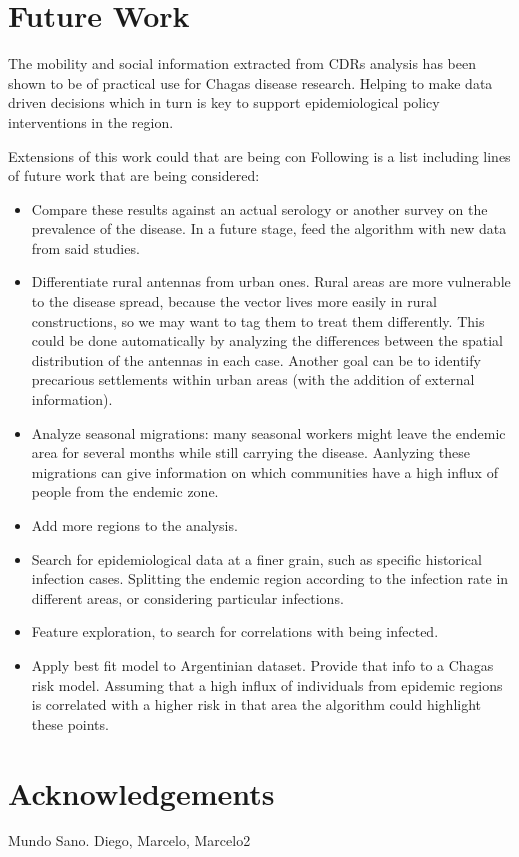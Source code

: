 \section{Future Work}

The mobility and social information extracted from CDRs analysis has been shown to be of practical use for Chagas disease research. Helping to make data driven decisions which in turn is key to support epidemiological policy interventions in the region. 

Extensions of this work could that are being con 
Following is a list including lines of future work that are being considered:

\begin{itemize}
    \item Compare these results against an actual serology or another survey on the prevalence of the disease. In a future stage, feed the algorithm with new data from said studies. 
    \item Differentiate rural antennas from urban ones. Rural areas are more vulnerable to the disease spread, because the vector lives more easily in rural constructions, so we may want to tag them to treat them differently. This could be done automatically by analyzing the differences between the spatial distribution of the antennas in each case. Another goal can be to identify precarious settlements within urban areas (with the addition of external information).
    \item Analyze seasonal migrations: many seasonal workers might leave the endemic area for several months while still carrying the disease. Aanlyzing these migrations can give information on which communities have a high influx of people from the endemic zone.
    \item Add more regions to the analysis.
    \item Search for epidemiological data at a finer grain, such as specific historical infection cases. Splitting the endemic region according to the infection rate in different areas, or considering particular infections.
    \item Feature exploration, to search for correlations with being infected.
    \item Apply best fit model to Argentinian dataset. Provide that info to a Chagas risk model. Assuming that a high influx of individuals from epidemic regions is correlated with a higher risk in that area the algorithm could highlight these points. %
\end{itemize}

\section{Acknowledgements}
Mundo Sano. Diego, Marcelo, Marcelo2